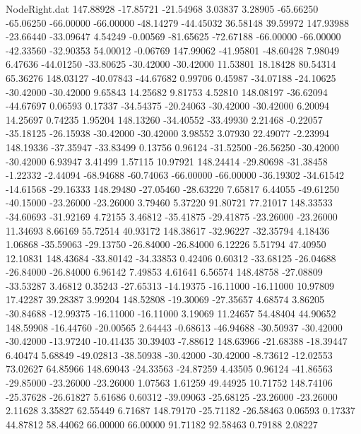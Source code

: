 \begin{filecontents}{NodeRight.dat}
 147.88928  -17.85721  -21.54968     3.03837    3.28905  -65.66250  -65.06250  -66.00000  -66.00000  -48.14279  -44.45032   36.58148   39.59972
 147.93988  -23.66440  -33.09647     4.54249   -0.00569  -81.65625  -72.67188  -66.00000  -66.00000  -42.33560  -32.90353   54.00012   -0.06769
 147.99062  -41.95801  -48.60428     7.98049    6.47636  -44.01250  -33.80625  -30.42000  -30.42000   11.53801   18.18428   80.54314   65.36276
 148.03127  -40.07843  -44.67682     0.99706    0.45987  -34.07188  -24.10625  -30.42000  -30.42000    9.65843   14.25682    9.81753    4.52810
 148.08197  -36.62094  -44.67697     0.06593    0.17337  -34.54375  -20.24063  -30.42000  -30.42000    6.20094   14.25697    0.74235    1.95204
 148.13260  -34.40552  -33.49930     2.21468   -0.22057  -35.18125  -26.15938  -30.42000  -30.42000    3.98552    3.07930   22.49077   -2.23994
 148.19336  -37.35947  -33.83499     0.13756    0.96124  -31.52500  -26.56250  -30.42000  -30.42000    6.93947    3.41499    1.57115   10.97921
 148.24414  -29.80698  -31.38458    -1.22332   -2.44094  -68.94688  -60.74063  -66.00000  -66.00000  -36.19302  -34.61542  -14.61568  -29.16333
 148.29480  -27.05460  -28.63220     7.65817    6.44055  -49.61250  -40.15000  -23.26000  -23.26000    3.79460    5.37220   91.80721   77.21017
 148.33533  -34.60693  -31.92169     4.72155    3.46812  -35.41875  -29.41875  -23.26000  -23.26000   11.34693    8.66169   55.72514   40.93172
 148.38617  -32.96227  -32.35794     4.18436    1.06868  -35.59063  -29.13750  -26.84000  -26.84000    6.12226    5.51794   47.40950   12.10831
 148.43684  -33.80142  -34.33853     0.42406    0.60312  -33.68125  -26.04688  -26.84000  -26.84000    6.96142    7.49853    4.61641    6.56574
 148.48758  -27.08809  -33.53287     3.46812    0.35243  -27.65313  -14.19375  -16.11000  -16.11000   10.97809   17.42287   39.28387    3.99204
 148.52808  -19.30069  -27.35657     4.68574    3.86205  -30.84688  -12.99375  -16.11000  -16.11000    3.19069   11.24657   54.48404   44.90652
 148.59908  -16.44760  -20.00565     2.64443   -0.68613  -46.94688  -30.50937  -30.42000  -30.42000  -13.97240  -10.41435   30.39403   -7.88612
 148.63966  -21.68388  -18.39447     6.40474    5.68849  -49.02813  -38.50938  -30.42000  -30.42000   -8.73612  -12.02553   73.02627   64.85966
 148.69043  -24.33563  -24.87259     4.43505    0.96124  -41.86563  -29.85000  -23.26000  -23.26000    1.07563    1.61259   49.44925   10.71752
 148.74106  -25.37628  -26.61827     5.61686    0.60312  -39.09063  -25.68125  -23.26000  -23.26000    2.11628    3.35827   62.55449    6.71687
 148.79170  -25.71182  -26.58463     0.06593    0.17337   44.87812   58.44062   66.00000   66.00000   91.71182   92.58463    0.79188    2.08227

\end{filecontents}
